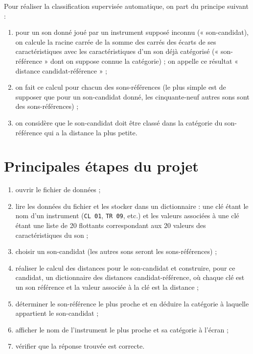 Pour réaliser la classification supervisée automatique, on part du principe suivant :
\begin{enumerate}
\item pour un son donné joué par un instrument supposé inconnu (« son-candidat{\fg}), on calcule la racine carrée de la somme des carrés des écarts de ses caractéristiques avec les caractéristiques d'un son déjà catégorisé (« son-référence » dont on suppose connue la catégorie) ; on appelle ce résultat « distance candidat-référence » ;
\item on fait ce calcul pour chacun des sons-références (le plus simple est de supposer que pour un son-candidat donné, les cinquante-neuf autres sons sont des sons-références) ;
\item on considère que le son-candidat doit être classé dans la catégorie du son-référence qui a la distance la plus petite.                                                                                                                                                                                                                                                                                                                                                               \end{enumerate}

\section{Principales étapes du projet}

\begin{enumerate}
 \item ouvrir le fichier de données ;
 \item lire les données du fichier et les stocker dans un dictionnaire : une clé étant le nom d'un instrument (\texttt{CL 01}, \texttt{TR 09}, etc.) et les valeurs associées à une clé étant une liste de 20 flottants correspondant aux 20 valeurs des caractéristiques du son ;
 \item choisir un son-candidat (les autres sons seront les sons-références) ;
 \item réaliser le calcul des distances pour le son-candidat et construire, pour ce candidat, un dictionnaire des distances candidat-référence, où chaque clé est un son référence et la valeur associée à la clé est la distance ;
 \item déterminer le son-référence le plus proche et en déduire la catégorie à laquelle appartient le son-candidat ;
 \item afficher le nom de l'instrument le plus proche et sa catégorie à l'écran ;
 \item vérifier que la réponse trouvée est correcte.
\end{enumerate}

